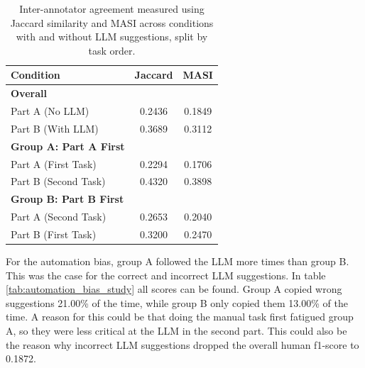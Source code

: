 \documentclass[
10pt, %
a4paper, %
oneside, %
headinclude,footinclude, %
] {book}%
\begin{document}
\begin{table}[htbp]
\centering
\begin{tabular}{lcc}
\toprule
\textbf{Condition} & \textbf{Jaccard} & \textbf{MASI} \\
\midrule

\textbf{Overall} & & \\
Part A (No LLM) & 0.2436 & 0.1849 \\
Part B (With LLM) & 0.3689 & 0.3112 \\
\midrule

\textbf{Group A: Part A First} & & \\
Part A (First Task) & 0.2294 & 0.1706 \\
Part B (Second Task) & 0.4320 & 0.3898 \\
\midrule

\textbf{Group B: Part B First} & & \\
Part A (Second Task) & 0.2653 & 0.2040 \\
Part B (First Task) & 0.3200 & 0.2470 \\
\bottomrule
\end{tabular}
\caption{Inter-annotator agreement measured using Jaccard similarity and MASI across conditions with and without LLM suggestions, split by task order.}
\label{tab:jaccard_masi_study}
\end{table}

For the automation bias, group A followed the LLM more times than group B. This was the case for the correct and incorrect LLM suggestions. In table \ref{tab:automation_bias_study} all scores can be found. Group A copied wrong suggestions 21.00\% of the time, while group B only copied them 13.00\% of the time. A reason for this could be that doing the manual task first fatigued group A, so they were less critical at the LLM in the second part. This could also be the reason why incorrect LLM suggestions dropped the overall human f1-score to 0.1872.
\end{document}
